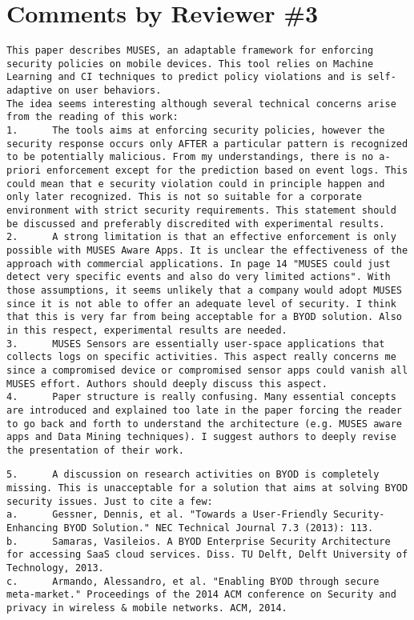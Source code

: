 \documentclass[preprint]{elsarticle}
\begin{document}
\section{Comments by Reviewer \#3}

\begin{verbatim}
This paper describes MUSES, an adaptable framework for enforcing security policies on mobile devices. This tool relies on Machine Learning and CI techniques to predict policy violations and is self-adaptive on user behaviors.
The idea seems interesting although several technical concerns arise from the reading of this work:
1.      The tools aims at enforcing security policies, however the security response occurs only AFTER a particular pattern is recognized to be potentially malicious. From my understandings, there is no a-priori enforcement except for the prediction based on event logs. This could mean that e security violation could in principle happen and only later recognized. This is not so suitable for a corporate environment with strict security requirements. This statement should be discussed and preferably discredited with experimental results.
2.      A strong limitation is that an effective enforcement is only possible with MUSES Aware Apps. It is unclear the effectiveness of the approach with commercial applications. In page 14 "MUSES could just detect very specific events and also do very limited actions". With those assumptions, it seems unlikely that a company would adopt MUSES since it is not able to offer an adequate level of security. I think that this is very far from being acceptable for a BYOD solution. Also in this respect, experimental results are needed.
3.      MUSES Sensors are essentially user-space applications that collects logs on specific activities. This aspect really concerns me since a compromised device or compromised sensor apps could vanish all MUSES effort. Authors should deeply discuss this aspect.
4.      Paper structure is really confusing. Many essential concepts are introduced and explained too late in the paper forcing the reader to go back and forth to understand the architecture (e.g. MUSES aware apps and Data Mining techniques). I suggest authors to deeply revise the presentation of their work.
\end{verbatim}

\begin{verbatim}
5.      A discussion on research activities on BYOD is completely missing. This is unacceptable for a solution that aims at solving BYOD security issues. Just to cite a few:
a.      Gessner, Dennis, et al. "Towards a User-Friendly Security-Enhancing BYOD Solution." NEC Technical Journal 7.3 (2013): 113.
b.      Samaras, Vasileios. A BYOD Enterprise Security Architecture for accessing SaaS cloud services. Diss. TU Delft, Delft University of Technology, 2013.
c.      Armando, Alessandro, et al. "Enabling BYOD through secure meta-market." Proceedings of the 2014 ACM conference on Security and privacy in wireless & mobile networks. ACM, 2014.
\end{verbatim}
\end{document}
